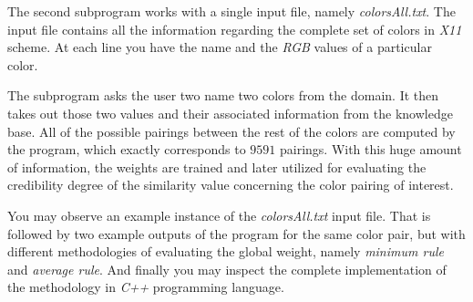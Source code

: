 \documentclass[egilmezThesis.tex]{subfiles}
\begin{document}
The second subprogram works with a single input file, namely \textit{colorsAll.txt}.  The input file contains all the information regarding the complete set of colors in \textit{X11} scheme. At each line you have the name and the \textit{RGB} values of a particular color. 

The subprogram asks the user two name two colors from the domain. It then takes out those two values and their associated information from the knowledge base. All of the possible pairings between the rest of the colors are computed by the program, which exactly corresponds to $9591$ pairings. With this huge amount of information, the weights are trained and later utilized for evaluating the credibility degree of the similarity value concerning the color pairing of interest.

You may observe an example instance of the \textit{colorsAll.txt} input file. That is followed by two example outputs of the program for the same color pair, but with different methodologies of evaluating the global weight, namely \textit{minimum rule} and \textit{average rule}. And finally you may inspect the complete implementation of the methodology in \textit{C++} programming language.
\end{document}
